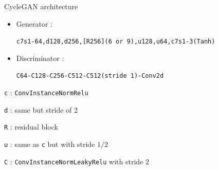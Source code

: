 \documentclass[12pt]{beamer}
\begin{document}
    \begin{frame}{CycleGAN architecture}
        \begin{itemize}
            \item Generator :
            \begin{center}
                \footnotesize{\texttt{c7s1-64,d128,d256,[R256](6 or 9),u128,u64,c7s1-3(Tanh)}}
            \end{center}
            \item Discriminator :
            \begin{center}
                \footnotesize{\texttt{C64-C128-C256-C512-C512(stride 1)-Conv2d}}
            \end{center}
        \end{itemize}
        
        \footnotesize{
            \texttt{c} : \texttt{ConvInstanceNormRelu}
            
            \texttt{d} : same but stride of $2$
            
            \texttt{R} : residual block
            
            \texttt{u} : same as \texttt{c} but with stride $1/2$
            
            \texttt{C} : \texttt{ConvInstanceNormLeakyRelu} with stride $2$
        }
    \end{frame}
\end{document}
